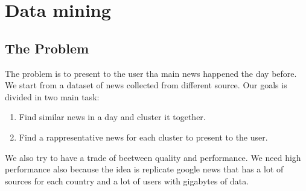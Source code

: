 \documentclass{acm_proc_article-sp}
\begin{document}
\section{Data mining}
\vspace{2mm}
\subsection{The Problem}
\vspace{2mm}
The problem is to present to the user tha main news happened the day before. We start from a dataset of news collected from different source. Our goals is divided in two main task:
\begin{enumerate}
\item Find similar news in a day and cluster it together.
\item Find a rappresentative news for each cluster to present to the user.
\end{enumerate}
We also try to have a trade of beetween quality and performance. We need high performance also because the idea is replicate google news that has a lot of sources for each country and a lot of users with gigabytes of data.
\end{document}
